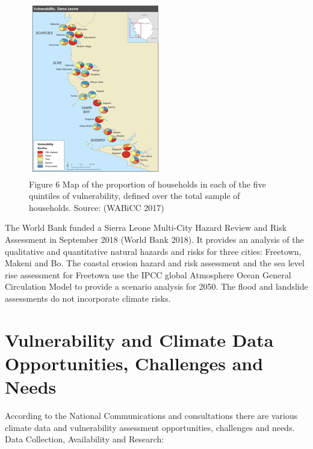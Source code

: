 \documentclass[
]{book}
\begin{document}
\begin{figure}
\centering
\includegraphics{images/figure6_vuln_hh.png}
\caption{Figure 6 Map of the proportion of households in each of the five quintiles of vulnerability, defined over the total sample of households. Source: (WABiCC 2017)}
\end{figure}

The World Bank funded a Sierra Leone Multi-City Hazard Review and Risk Assessment in September 2018 (World Bank 2018). It provides an analysis of the qualitative and quantitative natural hazards and risks for three cities: Freetown, Makeni and Bo. The coastal erosion hazard and risk assessment and the sea level rise assessment for Freetown use the IPCC global Atmosphere Ocean General Circulation Model to provide a scenario analysis for 2050. The flood and landslide assessments do not incorporate climate risks.

\hypertarget{vulnerability-and-climate-data-opportunities-challenges-and-needs}{%
\section{Vulnerability and Climate Data Opportunities, Challenges and Needs}\label{vulnerability-and-climate-data-opportunities-challenges-and-needs}}

According to the National Communications and consultations there are various climate data and vulnerability assessment opportunities, challenges and needs.\\
Data Collection, Availability and Research:
\end{document}
